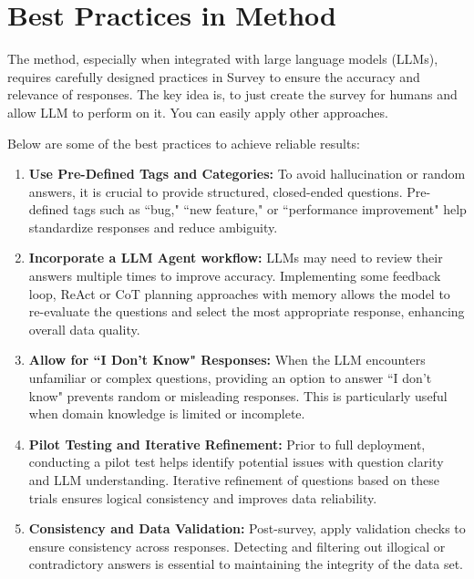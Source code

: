 
\section{Best Practices in \sys Method}

The \sys method, especially when integrated with large language models (LLMs), requires carefully designed practices in Survey to ensure the accuracy and relevance of responses. The key idea is, to just create the survey for humans and allow LLM to perform on it. You can easily apply other approaches.

Below are some of the best practices to achieve reliable results:

\begin{enumerate}
    \item \textbf{Use Pre-Defined Tags and Categories:} To avoid hallucination or random answers, it is crucial to provide structured, closed-ended questions. Pre-defined tags such as ``bug," ``new feature," or ``performance improvement" help standardize responses and reduce ambiguity.
    
    \item \textbf{Incorporate a LLM Agent workflow:} LLMs may need to review their answers multiple times to improve accuracy. Implementing some feedback loop, ReAct or CoT planning approaches with memory allows the model to re-evaluate the questions and select the most appropriate response, enhancing overall data quality.
    
    \item \textbf{Allow for ``I Don’t Know" Responses:} When the LLM encounters unfamiliar or complex questions, providing an option to answer ``I don’t know" prevents random or misleading responses. This is particularly useful when domain knowledge is limited or incomplete.
    
    \item \textbf{Pilot Testing and Iterative Refinement:} Prior to full deployment, conducting a pilot test helps identify potential issues with question clarity and LLM understanding. Iterative refinement of questions based on these trials ensures logical consistency and improves data reliability.
    
    \item \textbf{Consistency and Data Validation:} Post-survey, apply validation checks to ensure consistency across responses. Detecting and filtering out illogical or contradictory answers is essential to maintaining the integrity of the data set.
\end{enumerate}

